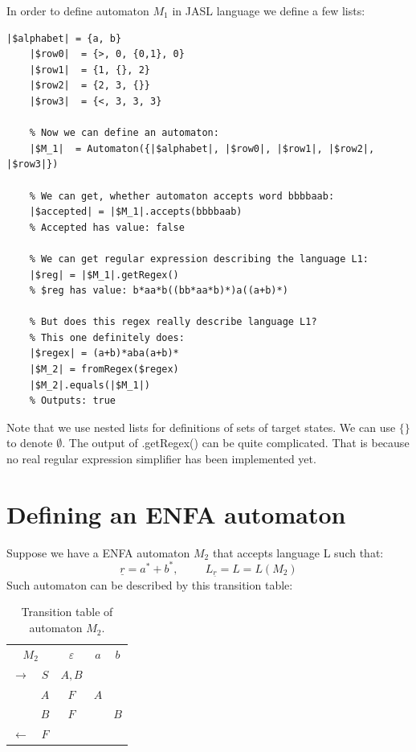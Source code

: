 \documentclass{ctuthesis}
\begin{document}
In order to define automaton $M_1$ in JASL language we define a few lists: 

\begin{minipage}{\linewidth}
\begin{lstlisting}[language = JASL]
	|$alphabet| = {a, b}
	|$row0|  = {>, 0, {0,1}, 0}
	|$row1|  = {1, {}, 2}
	|$row2|  = {2, 3, {}}
	|$row3|  = {<, 3, 3, 3}
    
	% Now we can define an automaton:
	|$M_1|  = Automaton({|$alphabet|, |$row0|, |$row1|, |$row2|, |$row3|})

	% We can get, whether automaton accepts word bbbbaab:
	|$accepted| = |$M_1|.accepts(bbbbaab)   
	% Accepted has value: false 
	
	% We can get regular expression describing the language L1:
	|$reg| = |$M_1|.getRegex()
	% $reg has value: b*aa*b((bb*aa*b)*)a((a+b)*) 

	% But does this regex really describe language L1? 
	% This one definitely does:
	|$regex| = (a+b)*aba(a+b)*
	|$M_2| = fromRegex($regex)
	|$M_2|.equals(|$M_1|) 	
	% Outputs: true
\end{lstlisting}
\end{minipage}

Note that we use nested lists for definitions of sets of target states. We can use $\{\}$ to denote $\emptyset$. The output of .getRegex() can be quite complicated. That is because no real regular expression simplifier has been implemented yet.

\section{Defining an ENFA automaton}
\label{sec:example_ENFA}
Suppose we have a ENFA automaton $M_2$ that accepts language L such that:
\begin{equation*}
	\underline{r} = a^*+b^*, \hspace{1cm} L_{\underline{r}} = L = L(M_2) 
\end{equation*}
Such automaton can be described by this transition table:
\begin{table}[H]
\begin{ctucolortab}
\begin{tabular}{cc|ccc}
\multicolumn{2}{c}{$M_2$} & $\varepsilon$ & $a$ & $b$ \\\Midrule
$\rightarrow$ 	& $S$ & $A,B$  \\
				& $A$ & $F$ 	& $A$  \\
				& $B$ & $F$		& & $B$ \\
$\leftarrow$	& $F$ & 		&  
\end{tabular}
\end{ctucolortab}
\caption{Transition table of automaton $M_2$.}
\label{fig:examples_DFA_table}
\end{table} 
\end{document}
